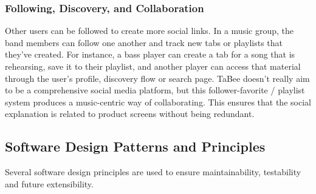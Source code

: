 \documentclass[a4paper, 12pt, titlepage]{article}
\begin{document}
\subsubsection{Following, Discovery, and Collaboration}

Other users can be followed to create more social links. In a music group, the band members can follow one another and track new tabs or playlists that they've created. For instance, a bass player can create a tab for a song that is rehearsing, save it to their playlist, and another player can access that material through the user's profile, discovery flow or search page. TaBee doesn't really aim to be a comprehensive social media platform, but this follower-favorite / playlist system produces a music-centric way of collaborating. This ensures that the social explanation is related to product screens without being redundant.

\subsection{Software Design Patterns and Principles}

Several software design principles are used to ensure maintainability, testability and future extensibility.
\end{document}
